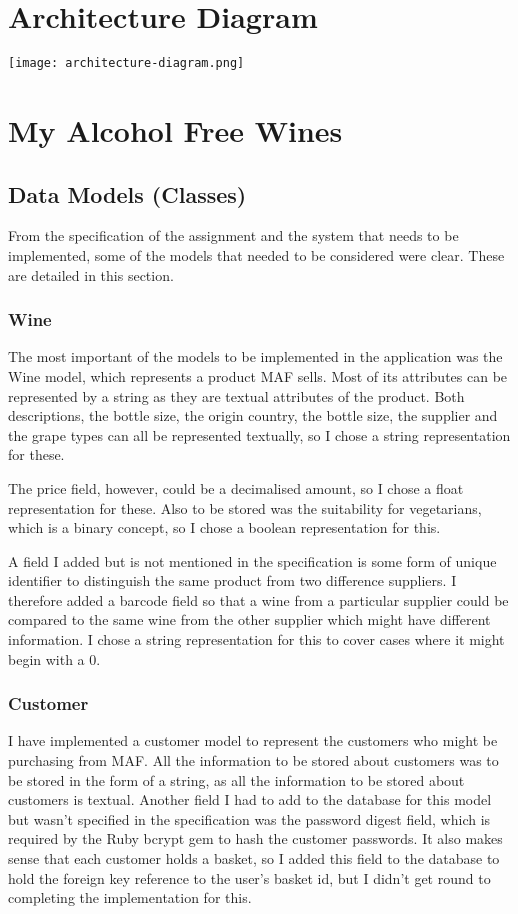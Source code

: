 \documentclass[a4paper,12pt,hidelinks]{report}
\begin{document}
    \section{Architecture Diagram}
    \texttt{[image: architecture-diagram.png]}
    \section{My Alcohol Free Wines}

    \subsection{Data Models (Classes)}
    From the specification of the assignment and the system that needs to be implemented, some of the models that needed to be considered were clear.
    These are detailed in this section.
    
    \subsubsection{Wine}
    The most important of the models to be implemented in the application was the Wine model, which represents a product MAF sells. Most of its attributes
    can be represented by a string as they are textual attributes of the product. Both descriptions, the bottle size, the origin country, the bottle size, the supplier
    and the grape types can all be represented textually, so I chose a string representation for these.
    
    The price field, however, could be a decimalised amount, so I chose a float representation for these. Also to be stored was the suitability for vegetarians, which 
    is a binary concept, so I chose a boolean representation for this. 
    
    A field I added but is not mentioned in the specification is some form of unique identifier to distinguish the same product from
    two difference suppliers. I therefore added a barcode field so that a wine from a particular supplier could be compared to the same wine from the other
    supplier which might have different information. I chose a string representation for this to cover cases where it might begin with a 0.

    \subsubsection{Customer}
    I have implemented a customer model to represent the customers who might be purchasing from MAF\@. All the information to be stored about customers was
    to be stored in the form of a string, as all the information to be stored about customers is textual. Another field I had to add to the database for this
    model but wasn't specified in the specification was the password digest field, which is required by the Ruby bcrypt gem to hash the customer passwords.
    It also makes sense that each customer holds a basket, so I added this field to the database to hold the foreign key reference to the user's basket id,
    but I didn't get round to completing the implementation for this.
\end{document}
